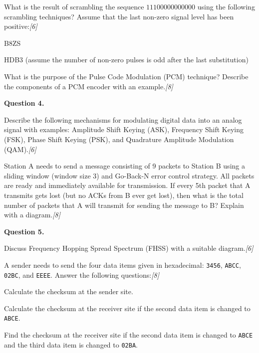 \documentclass[11pt,a4paper]{article}
\newcommand{\pts}[1]{\hfill   \textit{[#1]}}
\begin{document}
\begin{parts}
  \item What is the result of scrambling the sequence $11100000000000$ using the following scrambling techniques? Assume that the last non-zero signal level has been positive:\pts{6}
  
\begin{parts}
    \item B8ZS
    \item HDB3 (assume the number of non-zero pulses is odd after the last substitution)
  \end{parts}
  \item What is the purpose of the Pulse Code Modulation (PCM) technique? Describe the components of a PCM encoder with an example.\pts{8}
\end{parts}

\medskip


\noindent   \textbf{Question 4.}

\begin{parts}
  \item Describe the following mechanisms for modulating digital data into an analog signal with examples: Amplitude Shift Keying (ASK), Frequency Shift Keying (FSK), Phase Shift Keying (PSK), and Quadrature Amplitude Modulation (QAM).\pts{6}
  \item Station A needs to send a message consisting of 9 packets to Station B using a sliding window (window size 3) and Go-Back-N error control strategy. All packets are ready and immediately available for transmission. If every 5th packet that A transmits gets lost (but no ACKs from B ever get lost), then what is the total number of packets that A will transmit for sending the message to B? Explain with a diagram.\pts{8}
\end{parts}

\medskip


\noindent   \textbf{Question 5.}

\begin{parts}
  \item Discuss Frequency Hopping Spread Spectrum (FHSS) with a suitable diagram.\pts{6}
  \item A sender needs to send the four data items given in hexadecimal:   \texttt{3456},   \texttt{ABCC},   \texttt{02BC}, and   \texttt{EEEE}. Answer the following questions:\pts{8}
  
\begin{parts}
    \item Calculate the checksum at the sender site.
    \item Calculate the checksum at the receiver site if the second data item is changed to   \texttt{ABCE}.
    \item Find the checksum at the receiver site if the second data item is changed to   \texttt{ABCE} and the third data item is changed to   \texttt{02BA}.
  \end{parts}
\end{parts}
\end{document}

